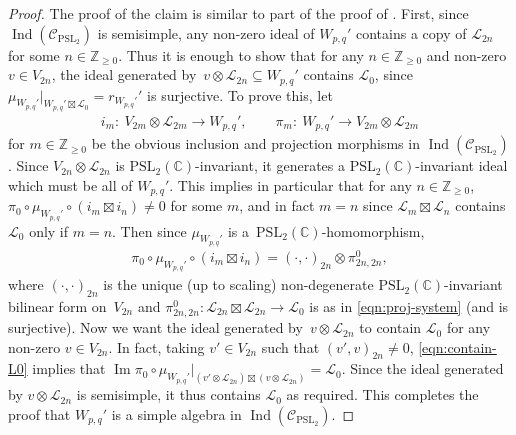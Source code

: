 \documentclass[pdftex]{sigma}
\numberwithin{equation}{section}
\theoremstyle{definition}
\begin{document}
\begin{proof}
The proof of the claim is similar to part of the proof of \cite[Proposition C.1]{MY-25-Vir}. First, since~$\operatorname{Ind}(\mathcal{C}_{\mathrm{PSL}_2})$ is semisimple, any non-zero ideal of $W_{p,q}'$ contains a copy of $\mathcal{L}_{2n}$ for some ${n\in\mathbb{Z}_{\geq 0}}$. Thus it is enough to show that for any $n\in\mathbb{Z}_{\geq 0}$ and non-zero $v\in V_{2n}$, the ideal generated by~${v\otimes\mathcal{L}_{2n}\subseteq W_{p,q}'}$ contains $\mathcal{L}_0$, since $\mu_{W_{p,q}'}\vert_{W_{p,q}'\boxtimes\mathcal{L}_0} = r_{W_{p,q}'}'$ is surjective.
To prove this, let
\begin{gather*}
i_m\colon\ V_{2m}\otimes\mathcal{L}_{2m}\longrightarrow W_{p,q}',\qquad \pi_m\colon\ W_{p,q}'\longrightarrow V_{2m}\otimes\mathcal{L}_{2m}
\end{gather*}
for $m\in\mathbb{Z}_{\geq 0}$ be the obvious inclusion and projection morphisms in $\operatorname{Ind}(\mathcal{C}_{\mathrm{PSL}_2})$. Since $V_{2n}\otimes\mathcal{L}_{2n}$ is $\mathrm{PSL}_2(\mathbb{C})$-invariant, it generates a $\mathrm{PSL}_2(\mathbb{C})$-invariant ideal which must be all of $W_{p,q}'$. This implies in particular that for any $n\in\mathbb{Z}_{\geq 0}$,
$
\pi_0\circ\mu_{W_{p,q}'}\circ(i_m\boxtimes i_n)\neq 0
$
for some $m$, and in fact $m=n$ since $\mathcal{L}_m\boxtimes\mathcal{L}_n$ contains $\mathcal{L}_0$ only if $m=n$. Then since $\mu_{W_{p,q}'}$ is a~$\mathrm{PSL}_2(\mathbb{C})$-homomorphism,
\begin{gather}\label{eqn:contain-L0}
\pi_0\circ\mu_{W_{p,q}'}\circ(i_m\boxtimes i_n) =(\cdot,\cdot)_{2n}\otimes\pi_{2n,2n}^0,
\end{gather}
where $(\cdot,\cdot)_{2n}$ is the unique (up to scaling) non-degenerate $\mathrm{PSL}_2(\mathbb{C})$-invariant bilinear form on~$V_{2n}$ and $\pi_{2n,2n}^0\colon \mathcal{L}_{2n}\boxtimes\mathcal{L}_{2n}\rightarrow\mathcal{L}_0$ is as in \eqref{eqn:proj-system} (and is surjective). Now we want the ideal generated by~${v\otimes\mathcal{L}_{2n}}$ to contain $\mathcal{L}_0$ for any non-zero $v\in V_{2n}$. In fact, taking $v'\in V_{2n}$ such that $(v',v)_{2n}\neq 0$, \eqref{eqn:contain-L0} implies that
$
\operatorname{Im} \pi_0\circ\mu_{W_{p,q}'}\vert_{(v'\otimes\mathcal{L}_{2n})\boxtimes (v\otimes\mathcal{L}_{2n})} =\mathcal{L}_0$.
Since the ideal generated by $v\otimes\mathcal{L}_{2n}$ is semisimple, it thus contains $\mathcal{L}_0$ as required. This completes the proof that $W_{p,q}'$ is a simple algebra in $\operatorname{Ind}(\mathcal{C}_{\mathrm{PSL}_2})$.


\end{proof}
\end{document}
